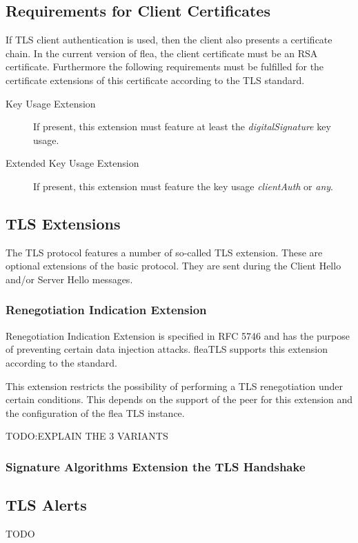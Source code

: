 \documentclass[a4paper,11pt]{scrartcl}
\begin{document}
\subsection{Requirements for Client Certificates}

If TLS client authentication is used, then the client also presents a
certificate chain. In the current version of flea, the client certificate must
be an RSA certificate. Furthermore the following requirements must be fulfilled
for the certificate extensions of this certificate according to the TLS standard.
\begin{description}
  \item [Key Usage Extension] If present, this extension must feature at least
    the \emph{digitalSignature} key usage.
  \item [Extended Key Usage Extension] If present, this extension must feature
    the key usage \emph{clientAuth} or \emph{any}.
\end{description}

\subsection{TLS Extensions}

The TLS protocol features a number of so-called TLS extension. These are
optional extensions of the basic protocol. They are sent during the Client Hello
and/or Server Hello messages. 
\subsubsection{Renegotiation Indication Extension}
Renegotiation Indication Extension is specified in RFC 5746 and has the purpose
of preventing certain data injection attacks. fleaTLS supports this extension
according to the standard.  

This extension restricts the possibility of performing a TLS renegotiation under
certain conditions. This depends on the support of the peer for this extension
and the configuration of the flea TLS instance. 

TODO:EXPLAIN THE 3 VARIANTS

\subsubsection{Signature Algorithms Extension the TLS Handshake}



\subsection{TLS Alerts}
TODO
\end{document}
